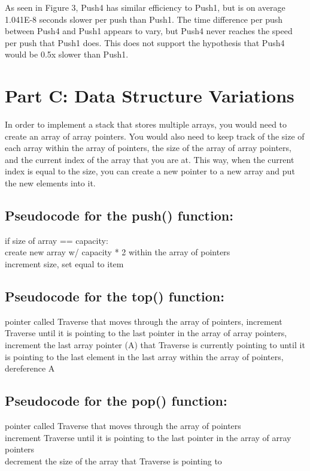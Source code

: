 \documentclass{article}
\begin{document}
As seen in Figure 3, Push4 has similar efficiency to Push1, but is on average 1.041E-8 seconds slower per push than Push1. The time difference per push between Push4 and Push1 appears to vary, but Push4 never reaches the speed per push that Push1 does. This does not support the hypothesis that Push4 would be 0.5x slower than Push1.

\section{Part C: Data Structure Variations}

In order to implement a stack that stores multiple arrays, you would need to create an array of array pointers. You would also need to keep track of the size of each array within the array of pointers, the size of the array of array pointers, and the current index of the array that you are at. This way, when the current index is equal to the size, you can create a new pointer to a new array and put the new elements into it.  

\pagebreak

\subsection{Pseudocode for the push() function:}
if size of array == capacity:\\
    create new array w/ capacity * 2 within the array of pointers\\
    increment size, set equal to item\\
    
\subsection{Pseudocode for the top() function:}
pointer called Traverse that moves through the array of pointers,
increment Traverse until it is pointing to the last pointer in the array of array pointers, increment the last array pointer (A) that Traverse is currently pointing to until it is pointing to the last element in the last array within the array of pointers, dereference A\\

\subsection{Pseudocode for the pop() function:} 
pointer called Traverse that moves through the array of pointers\\
increment Traverse until it is pointing to the last pointer in the array of array pointers\\
decrement the size of the array that Traverse is pointing to\\
\end{document}
